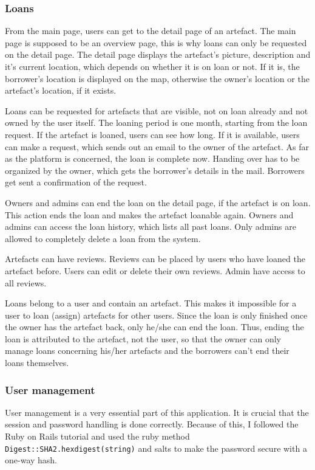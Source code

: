 \documentclass[fontsize=12pt,paper=a4]{scrartcl}
\begin{document}
\subsubsection{Loans}
From the main page, users can get to the detail page of an artefact. The main page is supposed to be an overview page, this is why loans can only be requested on the detail page. The detail page displays the artefact's picture, description and it's current location, which depends on whether it is on loan or not. If it is, the borrower's location is displayed on the map, otherwise the owner's location or the artefact's location, if it exists. 

Loans can be requested for artefacts that are visible, not on loan already and not owned by the user itself. The loaning period is one month, starting from the loan request. 
If the artefact is loaned, users can see how long. If it is available, users can make a request, which sends out an email to the owner of the artefact. As far as the platform is concerned, the loan is complete now. Handing over has to be organized by the owner, which gets the borrower's details in the mail. Borrowers get sent a confirmation of the request.

Owners and admins can end the loan on the detail page, if the artefact is on loan. This action ends the loan and makes the artefact loanable again. Owners and admins can access the loan history, which lists all past loans. Only admins are allowed to completely delete a loan from the system.

Artefacts can have reviews. Reviews can be placed by users who have loaned the artefact before. Users can edit or delete their own reviews. Admin have access to all reviews.

Loans belong to a user and contain an artefact. This makes it impossible for a user to loan (assign) artefacts for other users. Since the loan is only finished once the owner has the artefact back, only he/she can end the loan. Thus, ending the loan is attributed to the artefact, not the user, so that the owner can only manage loans concerning his/her artefacts and the borrowers can't end their loans themselves.

\subsubsection{User management}
User management is a very essential part of this application. It is crucial that the session and password handling is done correctly. Because of this, I followed the Ruby on Rails tutorial and used the ruby method \verb|Digest::SHA2.hexdigest(string)| and salts to make the password secure with a one-way hash. 
\end{document}
